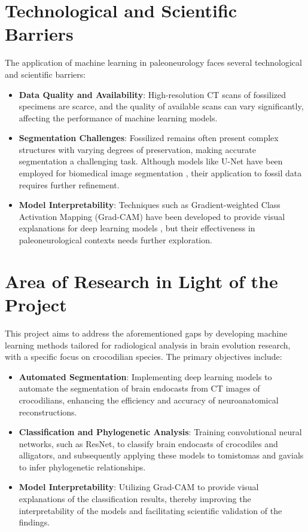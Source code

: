 \section{Technological and Scientific Barriers}

The application of machine learning in paleoneurology faces several technological and scientific barriers:

\begin{itemize}
    \item \textbf{Data Quality and Availability}: High-resolution CT scans of fossilized specimens are scarce, and the quality of available scans can vary significantly, affecting the performance of machine learning models.
    \item \textbf{Segmentation Challenges}: Fossilized remains often present complex structures with varying degrees of preservation, making accurate segmentation a challenging task. Although models like U-Net have been employed for biomedical image segmentation \cite{Ronneberger_2015}, their application to fossil data requires further refinement.
    \item \textbf{Model Interpretability}: Techniques such as Gradient-weighted Class Activation Mapping (Grad-CAM) have been developed to provide visual explanations for deep learning models \cite{Selvaraju_2017}, but their effectiveness in paleoneurological contexts needs further exploration.
\end{itemize}

\section{Area of Research in Light of the Project}

This project aims to address the aforementioned gaps by developing machine learning methods tailored for radiological analysis in brain evolution research, with a specific focus on crocodilian species. The primary objectives include:

\begin{itemize}
    \item \textbf{Automated Segmentation}: Implementing deep learning models to automate the segmentation of brain endocasts from CT images of crocodilians, enhancing the efficiency and accuracy of neuroanatomical reconstructions.
    \item \textbf{Classification and Phylogenetic Analysis}: Training convolutional neural networks, such as ResNet, to classify brain endocasts of crocodiles and alligators, and subsequently applying these models to tomistomas and gavials to infer phylogenetic relationships.
    \item \textbf{Model Interpretability}: Utilizing Grad-CAM to provide visual explanations of the classification results, thereby improving the interpretability of the models and facilitating scientific validation of the findings.
\end{itemize}